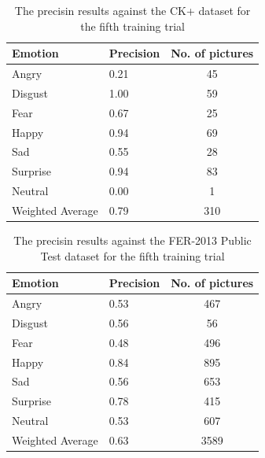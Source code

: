 \documentclass[runningheads,a4paper,11pt]{report}
\begin{document}
\begin{table}[htbp]
	\caption{The precisin results against the CK+ dataset for the fifth training trial}
	\label{fer_training_28k_01_mean_square_ckp}
		\begin{center}
			\begin{tabular}{p{110pt}p{110pt}c}
				\textbf{Emotion}& \textbf{Precision}& \textbf{No. of pictures} \\
				\hline\hline
				Angry& 0.21& 45 \\
				Disgust& 1.00& 59 \\
				Fear& 0.67& 25 \\
				Happy& 0.94& 69 \\
				Sad& 0.55& 28 \\
				Surprise& 0.94& 83 \\
				Neutral& 0.00& 1 \\
				\hline
				Weighted Average& 0.79& 310
			\end{tabular}
		\end{center}
\end{table}
\begin{table}[htbp]
	\caption{The precisin results against the FER-2013 Public Test dataset for the fifth training trial}
	\label{fer_training_28k_01_mean_square_public_test}
		\begin{center}
			\begin{tabular}{p{110pt}p{110pt}c}
				\textbf{Emotion}& \textbf{Precision}& \textbf{No. of pictures} \\
				\hline\hline
				Angry& 0.53& 467 \\
				Disgust& 0.56& 56 \\
				Fear& 0.48& 496 \\
				Happy& 0.84& 895 \\
				Sad& 0.56& 653 \\
				Surprise& 0.78& 415 \\
				Neutral& 0.53& 607 \\
				\hline
				Weighted Average& 0.63 &3589
			\end{tabular}
		\end{center}
\end{table}
\end{document}
